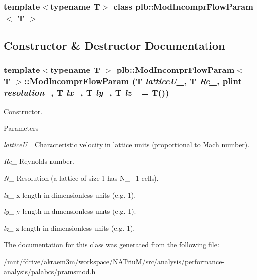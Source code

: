 \subsubsection*{template$<$typename T$>$ class plb::ModIncomprFlowParam$<$ T $>$}



\subsection{Constructor \& Destructor Documentation}
\hypertarget{classplb_1_1ModIncomprFlowParam_aa4270bb7a7a771f7b34ed7849857ba69}{
\subsubsection[{ModIncomprFlowParam}]{\setlength{\rightskip}{0pt plus 5cm}template$<$typename T $>$ {\bf plb::ModIncomprFlowParam}$<$ T $>$::{\bf ModIncomprFlowParam} (T {\em latticeU\_\-}, \/  T {\em Re\_\-}, \/  plint {\em resolution\_\-}, \/  T {\em lx\_\-}, \/  T {\em ly\_\-}, \/  T {\em lz\_\-} = {\ttfamily T()})}}
\label{classplb_1_1ModIncomprFlowParam_aa4270bb7a7a771f7b34ed7849857ba69}


Constructor. 
\begin{DoxyParams}{Parameters}
\item[{\em latticeU\_\-}]Characteristic velocity in lattice units (proportional to Mach number). \item[{\em Re\_\-}]Reynolds number. \item[{\em N\_\-}]Resolution (a lattice of size 1 has N\_\-+1 cells). \item[{\em lx\_\-}]x-\/length in dimensionless units (e.g. 1). \item[{\em ly\_\-}]y-\/length in dimensionless units (e.g. 1). \item[{\em lz\_\-}]z-\/length in dimensionless units (e.g. 1). \end{DoxyParams}


The documentation for this class was generated from the following file:\begin{DoxyCompactItemize}
\item 
/mnt/fdrive/akraem3m/workspace/NATriuM/src/analysis/performance-\/analysis/palabos/pramsmod.h\end{DoxyCompactItemize}
